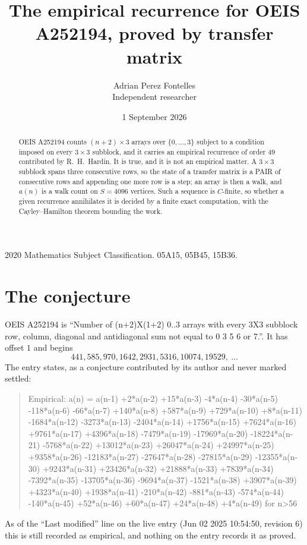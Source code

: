 \documentclass[11pt,a4paper]{article}
\title{The empirical recurrence for OEIS A252194, proved by transfer matrix}
\author{Adrian Perez Fontelles\\ \small Independent researcher}
\date{1 September 2026}
\theoremstyle{plain}
\theoremstyle{definition}
\begin{document}
\maketitle

\begin{abstract}
OEIS A252194 counts $(n+2)\times3$ arrays over $\{0,\dots,3\}$ subject to a condition imposed on
every $3\times3$ subblock, and it carries an empirical recurrence of order $49$
contributed by R.~H.~Hardin. It is true, and it is not an empirical matter. A $3\times3$
subblock spans three consecutive rows, so the state of a transfer matrix is a PAIR of
consecutive rows and appending one more row is a step; an array is then a walk, and
$a(n)$ is a walk count on $S=4096$ vertices. Such a sequence is $C$-finite, so whether a given
recurrence annihilates it is decided by a finite exact computation, with the Cayley--Hamilton
theorem bounding the work.
\end{abstract}

\noindent\small 2020 Mathematics Subject Classification. 05A15, 05B45, 15B36.\normalsize

\section{The conjecture}

OEIS A252194 is ``Number of (n+2)X(1+2) 0..3 arrays with every 3X3 subblock row, column, diagonal and antidiagonal sum not equal to 0 3 5 6 or 7.''. It has offset $1$ and begins
\[
441, 585, 970, 1642, 2931, 5316, 10074, 19529,\ \dots
\]
The entry states, as a conjecture contributed by its author and never marked settled:
\begin{quote}
Empirical: a(n) = a(n-1) +2*a(n-2) +15*a(n-3) -4*a(n-4) -30*a(n-5) -118*a(n-6) -66*a(n-7) +140*a(n-8) +587*a(n-9) +729*a(n-10) +8*a(n-11) -1684*a(n-12) -3273*a(n-13) -2404*a(n-14) +1756*a(n-15) +7624*a(n-16) +9761*a(n-17) +4396*a(n-18) -7479*a(n-19) -17969*a(n-20) -18224*a(n-21) -5768*a(n-22) +13012*a(n-23) +26047*a(n-24) +24997*a(n-25) +9358*a(n-26) -12183*a(n-27) -27647*a(n-28) -27815*a(n-29) -12355*a(n-30) +9243*a(n-31) +23426*a(n-32) +21888*a(n-33) +7839*a(n-34) -7392*a(n-35) -13705*a(n-36) -9694*a(n-37) -1521*a(n-38) +3907*a(n-39) +4323*a(n-40) +1938*a(n-41) -210*a(n-42) -881*a(n-43) -574*a(n-44) -140*a(n-45) +52*a(n-46) +60*a(n-47) +24*a(n-48) +4*a(n-49) for n>56
\end{quote}
As of the ``Last modified'' line on the live entry (Jun 02 2025 10:54:50, revision 6) this is still
recorded as empirical, and nothing on the entry records it as proved.
\end{document}
